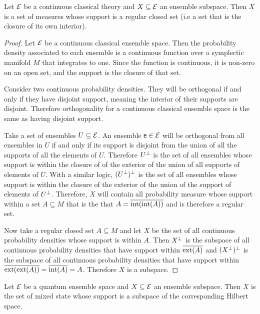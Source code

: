 \begin{prop}
	Let $\mathcal{E}$ be a continuous classical theory and $X \subseteq \mathcal{E}$ an ensemble subspace. Then $X$ is a set of measures whose support is a regular closed set (i.e a set that is the closure of its own interior).
\end{prop}

\begin{proof}
	Let $\mathcal{E}$ be a continuous classical ensemble space. Then the probability density associated to each ensemble is a continuous function over a symplectic manifold $M$ that integrates to one. Since the function is continuous, it is non-zero on an open set, and the support is the closure of that set.
	
	Consider two continuous probability densities. They will be orthogonal if and only if they have disjoint support, meaning the interior of their supports are disjoint. Therefore orthogonality for a continuous classical ensemble space is the same as having disjoint support.
	
	Take a set of ensembles $U \subseteq \mathcal{E}$. An ensemble $\mathsf{e} \in \mathcal{E}$ will be orthogonal from all ensembles in $U$ if and only if its support is disjoint from the union of all the supports of all the elements of $U$. Therefore $U^\perp$ is the set of all ensembles whose support is within the closure of of the exterior of the union of all supports of elements of $U$. With a similar logic, $(U^\perp)^\perp$ is the set of all ensembles whose support is within the closure of the exterior of the union of the support of elements of $U^\perp$. Therefore, $X$ will contain all probability measure whose support within a set $A \subseteq M$ that is the that $A = \overline{\operatorname{int}(\operatorname{int}(A))}$ and is therefore a regular set.
	
	Now take a regular closed set $A \subseteq M$ and let $X$ be the set of all continuous probability densities whose support is within $A$. Then $X^\perp$ is the subspace of all continuous probability densities that have support within $\overline{\operatorname{ext}(A)}$ and $(X^\perp)^\perp$ is the subspace of all continuous probability densities that have support within $\overline{\operatorname{ext}(\operatorname{ext}(A))} = \overline{\operatorname{int}(A)} = A$. Therefore $X$ is a subspace.
\end{proof}

\begin{prop}
	Let $\mathcal{E}$ be a quantum ensemble space and $X \subseteq \mathcal{E}$ an ensemble subspace. Then $X$ is the set of mixed state whose support is a subspace of the corresponding Hilbert space.
\end{prop}

